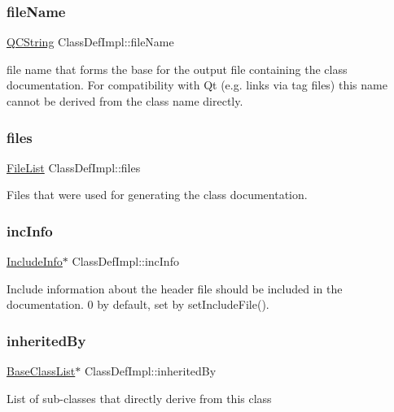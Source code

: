 \subsubsection{\texorpdfstring{fileName}{fileName}}
{\footnotesize\ttfamily \mbox{\hyperlink{class_q_c_string}{Q\+C\+String}} Class\+Def\+Impl\+::file\+Name}

file name that forms the base for the output file containing the class documentation. For compatibility with Qt (e.\+g. links via tag files) this name cannot be derived from the class name directly. \mbox{\label{class_class_def_impl_a4d615eed35e81984df99b64bd9334e55}} 
\subsubsection{\texorpdfstring{files}{files}}
{\footnotesize\ttfamily \mbox{\hyperlink{class_file_list}{File\+List}} Class\+Def\+Impl\+::files}

Files that were used for generating the class documentation. \mbox{\label{class_class_def_impl_abff21ee2a293a91dd508f664930ab6bc}} 
\subsubsection{\texorpdfstring{incInfo}{incInfo}}
{\footnotesize\ttfamily \mbox{\hyperlink{struct_include_info}{Include\+Info}}$\ast$ Class\+Def\+Impl\+::inc\+Info}

Include information about the header file should be included in the documentation. 0 by default, set by set\+Include\+File(). \mbox{\label{class_class_def_impl_a9134929b4e91fa202dad541f7a9c89ac}} 
\subsubsection{\texorpdfstring{inheritedBy}{inheritedBy}}
{\footnotesize\ttfamily \mbox{\hyperlink{class_base_class_list}{Base\+Class\+List}}$\ast$ Class\+Def\+Impl\+::inherited\+By}

List of sub-\/classes that directly derive from this class \mbox{\label{class_class_def_impl_adcf9ff4fb9cc0c6519e58143057ba078}} 
